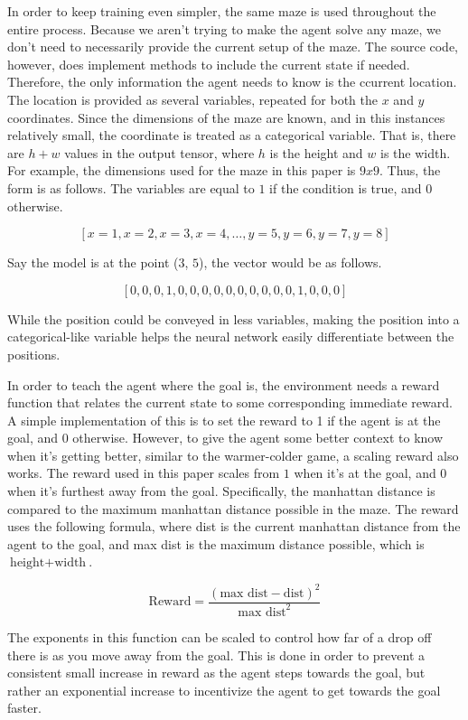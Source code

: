 \documentclass[12pt,letterpaper]{article}
\begin{document}
In order to keep training even simpler, the same maze is used throughout the entire process.
Because we aren't trying to make the agent solve any maze, we don't need to necessarily provide the current setup of the maze.
The source code, however, does implement methods to include the current state if needed.
Therefore, the only information the agent needs to know is the ccurrent location.
The location is provided as several variables, repeated for both the $x$ and $y$ coordinates.
Since the dimensions of the maze are known, and in this instances relatively small, the coordinate is treated as a categorical variable.
That is, there are $h + w$ values in the output tensor, where $h$ is the height and $w$ is the width.
For example, the dimensions used for the maze in this paper is $9x9$.
Thus, the form is as follows. The variables are equal to $1$ if the condition is true, and $0$ otherwise.

$$\left [ x = 1 , x = 2 , x = 3 , x = 4 , \hdots , y = 5 , y = 6 , y = 7 , y = 8 \right]$$

Say the model is at the point ($3$, $5$), the vector would be as follows.

$$\left[0,0,0,1,0,0,0,0,0,0,0,0,0,0,1,0,0,0\right]$$

While the position could be conveyed in less variables, making the position into a categorical-like variable helps the neural network easily differentiate between the positions.

In order to teach the agent where the goal is, the environment needs a reward function that relates the current state to some corresponding immediate reward.
A simple implementation of this is to set the reward to 1 if the agent is at the goal, and 0 otherwise.
However, to give the agent some better context to know when it's getting better, similar to the warmer-colder game, a scaling reward also works.
The reward used in this paper scales from $1$ when it's at the goal, and $0$ when it's furthest away from the goal.
Specifically, the manhattan distance is compared to the maximum manhattan distance possible in the maze.
The reward uses the following formula, where dist is the current manhattan distance from the agent to the goal, and max dist is the maximum distance possible, which is $\text{height} + \text{width}$.

$$\text{Reward} = \frac{(\text{max dist} - \text{dist}) ^ 2}{\text{max dist}^2}$$

The exponents in this function can be scaled to control how far of a drop off there is as you move away from the goal.
This is done in order to prevent a consistent small increase in reward as the agent steps towards the goal, but rather an exponential increase to incentivize the agent to get towards the goal faster.
\end{document}
